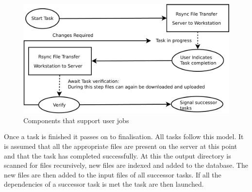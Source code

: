 \documentclass[12pt,a4paper]{report}
\begin{document}
\begin{figure}[!h]
    \begin{center}
        \includegraphics[scale=0.35]{figures/user_impl2.pdf}
    \end{center}
    \caption{Components that support user jobs}
    \label{user_task_impl2}
\end{figure}
    Once a task is finished it passes on to finalisation. All tasks follow this model. It
    is assumed that all the appropriate files are present on the server at this point and
    that the task has completed successfully. At this the output directory is scanned for
    files recursively, new files are indexed and added to the database. The new files are then
    added to the input files of all successor tasks. If all the dependencies of a successor
    task is met the task  are then launched.
\end{document}
